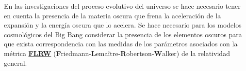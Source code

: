 En las investigaciones del proceso evolutivo del universo se hace necesario tener en cuenta la presencia de la materia oscura que frena la aceleración de la expansión y la energía oscura que lo acelera. Se hace necesario para los modelos cosmológicos del Big Bang considerar la presencia de los elementos oscuros para que exista correspondencia con las medidas de los parámetros asociados con la métrica \href{https://es.wikipedia.org/wiki/M\%C3\%A9trica_de_Friedman-Lema\%C3\%AEtre-Robertson-Walker}{\textbf{FLRW}} (\textbf{F}riedmann-\textbf{L}emaître-\textbf{R}obertson-\textbf{W}alker) de la relatividad general. 




